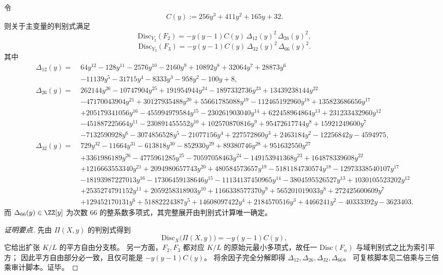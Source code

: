 \begin{conclusion}\label{con:xi-terminal-zm-elliptic-weight-modular-discriminant-rigidity}
令
\[
C(y):=256y^3+411y^2+165y+32.
\]
则关于主变量的判别式满足
\[
\mathrm{Disc}_{Y_2}(F_2)
=-y(y-1)C(y)\,\Delta_{12}(y)^2\,\Delta_{26}(y)^2,
\]
\[
\mathrm{Disc}_{Y_3}(F_3)
=-y(y-1)C(y)\,\Delta_{32}(y)^2\,\Delta_{66}(y)^2.
\]
其中
\[
\begin{aligned}
\Delta_{12}(y)=\;&64y^{12}-128y^{11}-2576y^{10}-2160y^9+10892y^8+32064y^7+28873y^6\\
&-11139y^5-31715y^4-8333y^3-958y^2-100y+8,\\[1mm]
\Delta_{26}(y)=\;&262144y^{26}-10747904y^{25}+191954944y^{24}-1897332736y^{23}+13439238144y^{22}\\
&-47170043904y^{21}+30127935488y^{20}+55661785088y^{19}-112465192960y^{18}+135823686656y^{17}\\
&+205179341056y^{16}-455994979584y^{15}-230261903040y^{14}+622458964864y^{13}+231233432960y^{12}\\
&-451887225664y^{11}-230891455552y^{10}+102570870816y^9+95472617744y^8+15921249600y^7\\
&-7132590928y^6-3074856528y^5-21077156y^4+227572860y^3+2463184y^2-12256842y-4594975,\\[1mm]
\Delta_{32}(y)=\;&729y^{32}-11664y^{31}-613818y^{30}-852930y^{29}+89380746y^{28}+951632550y^{27}\\
&+3361986189y^{26}-4775961285y^{25}-70597058463y^{24}-149153941368y^{23}+164878339608y^{22}\\
&+1216663553340y^{21}+2094980657743y^{20}+480584573657y^{19}-5181184730574y^{18}-12973338540107y^{17}\\
&-18193987227013y^{16}-17306459138646y^{15}-11134137450965y^{14}-3804595526527y^{13}+1030105523202y^{12}\\
&+2535274791152y^{11}+2059258318903y^{10}+1166338577370y^9+565201019033y^8+272425600609y^7\\
&+129452170131y^6+51882224387y^5+14608097422y^4+2184570516y^3+4466241y^2-40333392y-3623403.
\end{aligned}
\]
而 \(\Delta_{66}(y)\in\ZZ[y]\) 为次数 \(66\) 的整系数多项式，其完整展开由判别式计算唯一确定。
\end{conclusion}
\begin{proof}[证明要点]
先由 \(\Pi(X,y)\) 的判别式得到
\[
\mathrm{Disc}_{X}\!\bigl(\Pi(X,y)\bigr)=-y(y-1)C(y),
\]
它给出扩张 \(K/L\) 的平方自由分支核。
另一方面，\(F_2,F_3\) 都对应 \(K/L\) 的原始元最小多项式，故任一 \(\mathrm{Disc}(F_n)\) 与域判别式之比为索引平方；
因此平方自由部分必一致，且仅可能是 \(-y(y-1)C(y)\)。
将余因子完全分解即得 \(\Delta_{12},\Delta_{26},\Delta_{32},\Delta_{66}\)。
可复核脚本见二倍乘与三倍乘审计脚本。证毕。
\end{proof}


